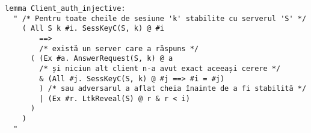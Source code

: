 \documentclass[xcolor=dvipsnames,handout]{beamer}
\newcommand{\fr}[1]{\frame{#1}}
\newcommand{\ft}[1]{\frametitle{\color{bleumarin}{\hfill #1 \hfill}}}
\begin{document}
\begin{frame}[fragile]
  \ft{Proprietate suplimentară: autorizare injectivă}

  {\footnotesize
\begin{verbatim}
lemma Client_auth_injective:
  " /* Pentru toate cheile de sesiune 'k' stabilite cu serverul 'S' */
    ( All S k #i. SessKeyC(S, k) @ #i
        ==>
        /* există un server care a răspuns */
      ( (Ex #a. AnswerRequest(S, k) @ a
        /* și niciun alt client n-a avut exact aceeași cerere */
        & (All #j. SessKeyC(S, k) @ #j ==> #i = #j)
        ) /* sau adversarul a aflat cheia înainte de a fi stabilită */
        | (Ex #r. LtkReveal(S) @ r & r < i)
      )
    )
  "
\end{verbatim}
  }
\end{frame}


\fr{
  \ft{Bibliografie}
  
  
  \nocite{*}
}
\end{document}
